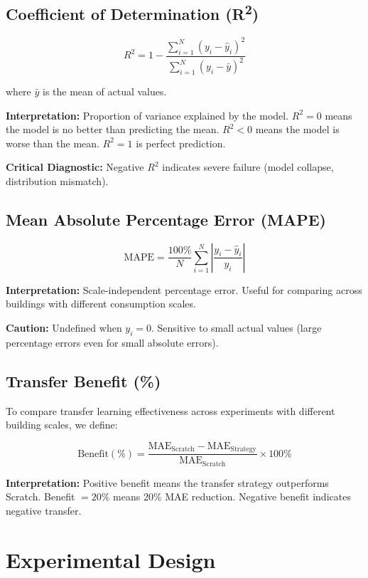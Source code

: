 \documentclass[12pt,a4paper]{report}
\begin{document}
\subsection{Coefficient of Determination (R\textsuperscript{2})}

\[
R^2 = 1 - \frac{\sum_{i=1}^{N} (y_i - \hat{y}_i)^2}{\sum_{i=1}^{N} (y_i - \bar{y})^2}
\]

where \(\bar{y}\) is the mean of actual values.

\textbf{Interpretation:} Proportion of variance explained by the model. \(R^2 = 0\) means the model is no better than predicting the mean. \(R^2 < 0\) means the model is worse than the mean. \(R^2 = 1\) is perfect prediction.

\textbf{Critical Diagnostic:} Negative \(R^2\) indicates severe failure (model collapse, distribution mismatch).

\subsection{Mean Absolute Percentage Error (MAPE)}

\[
\text{MAPE} = \frac{100\%}{N} \sum_{i=1}^{N} \left| \frac{y_i - \hat{y}_i}{y_i} \right|
\]

\textbf{Interpretation:} Scale-independent percentage error. Useful for comparing across buildings with different consumption scales.

\textbf{Caution:} Undefined when \(y_i = 0\). Sensitive to small actual values (large percentage errors even for small absolute errors).

\subsection{Transfer Benefit (\%)}

To compare transfer learning effectiveness across experiments with different building scales, we define:

\[
\text{Benefit}(\%) = \frac{\text{MAE}_{\text{Scratch}} - \text{MAE}_{\text{Strategy}}}{\text{MAE}_{\text{Scratch}}} \times 100\%
\]

\textbf{Interpretation:} Positive benefit means the transfer strategy outperforms Scratch. Benefit $= 20\%$ means 20\% MAE reduction. Negative benefit indicates negative transfer.

\section{Experimental Design}
\end{document}
